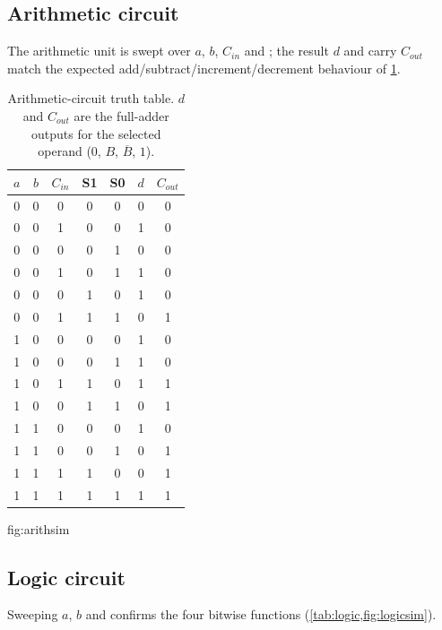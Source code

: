 \subsection{Arithmetic circuit}
The arithmetic unit is swept over $a$, $b$, $C_{in}$ and ;
the result $d$ and carry $C_{out}$ match the expected
add/subtract/increment/decrement behaviour of \cref{tab:arith}.

\begin{table}[htbp]
\centering
\caption{Arithmetic-circuit truth table. $d$ and $C_{out}$ are the full-adder
outputs for the selected operand ($0$, $B$, $\overline{B}$, $1$).}
\label{tab:arith}
\small
\begin{tabular}{@{}ccc cc cc@{}}
\toprule
$a$ & $b$ & $C_{in}$ & S1 & S0 & $d$ & $C_{out}$\\
\midrule
0&0&0 & 0&0 & 0&0\\
0&0&1 & 0&0 & 1&0\\
0&0&0 & 0&1 & 0&0\\
0&0&1 & 0&1 & 1&0\\
0&0&0 & 1&0 & 1&0\\
0&0&1 & 1&1 & 0&1\\
1&0&0 & 0&0 & 1&0\\
1&0&0 & 0&1 & 1&0\\
1&0&1 & 1&0 & 1&1\\
1&0&0 & 1&1 & 0&1\\
1&1&0 & 0&0 & 1&0\\
1&1&0 & 0&1 & 0&1\\
1&1&1 & 1&0 & 0&1\\
1&1&1 & 1&1 & 1&1\\
\bottomrule
\end{tabular}
\end{table}

{fig:arithsim}

\subsection{Logic circuit}
Sweeping $a$, $b$ and  confirms the four bitwise functions
(\cref{tab:logic,fig:logicsim}).

